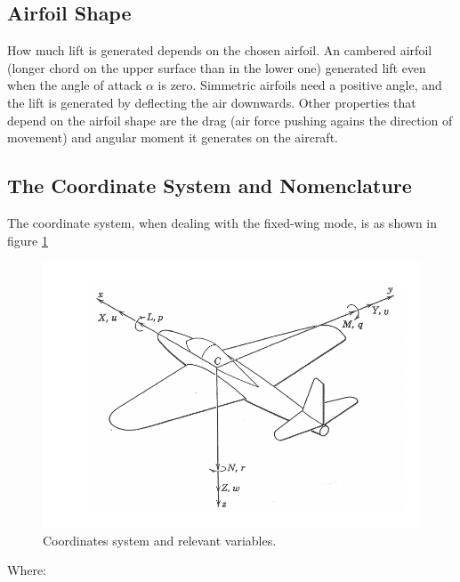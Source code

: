 \subsection{Airfoil Shape}
How much lift is generated depends on the chosen airfoil.
%
An cambered airfoil (longer chord on the upper surface than in the lower one) generated lift even when the angle of attack $\alpha$ is zero.
Simmetric airfoils need a positive angle, and the lift is generated by deflecting the air downwards.
Other properties that depend on the airfoil shape are the drag (air force pushing agains the direction of movement) and angular moment it generates on the aircraft. 

\subsection{The Coordinate System and Nomenclature}

The coordinate system, when dealing with the fixed-wing mode, is as shown in figure \ref{fig:coords1}

\begin{figure}
\centering
  \includegraphics[width=\linewidth]{figs/axis1.png}
  \caption{Coordinates system and relevant variables.}
  \label{fig:coords1}
\end{figure}

Where:



